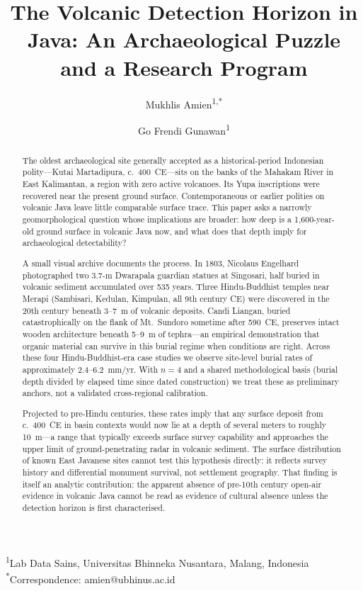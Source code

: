 \documentclass[12pt,a4paper]{article}
\begin{document}
\title{The Volcanic Detection Horizon in Java: An Archaeological Puzzle and a Research Program}

\author{Mukhlis Amien\textsuperscript{1,*} \and Go Frendi Gunawan\textsuperscript{1}}

\date{}

\maketitle

\noindent\textsuperscript{1}Lab Data Sains, Universitas Bhinneka Nusantara, Malang, Indonesia\\
\textsuperscript{*}Correspondence: amien@ubhinus.ac.id

\begin{abstract}
The oldest archaeological site generally accepted as a historical-period Indonesian polity---Kutai Martadipura, c.~400~CE---sits on the banks of the Mahakam River in East Kalimantan, a region with zero active volcanoes. Its Yupa inscriptions were recovered near the present ground surface. Contemporaneous or earlier polities on volcanic Java leave little comparable surface trace. This paper asks a narrowly geomorphological question whose implications are broader: how deep is a 1,600-year-old ground surface in volcanic Java now, and what does that depth imply for archaeological detectability?

A small visual archive documents the process. In 1803, Nicolaus Engelhard photographed two 3.7-m Dwarapala guardian statues at Singosari, half buried in volcanic sediment accumulated over 535 years. Three Hindu-Buddhist temples near Merapi (Sambisari, Kedulan, Kimpulan, all 9th century CE) were discovered in the 20th century beneath 3--7~m of volcanic deposits. Candi Liangan, buried catastrophically on the flank of Mt.\ Sundoro sometime after 590~CE, preserves intact wooden architecture beneath 5--9~m of tephra---an empirical demonstration that organic material can survive in this burial regime when conditions are right. Across these four Hindu-Buddhist-era case studies we observe site-level burial rates of approximately 2.4--6.2~mm/yr. With $n=4$ and a shared methodological basis (burial depth divided by elapsed time since dated construction) we treat these as preliminary anchors, not a validated cross-regional calibration.

Projected to pre-Hindu centuries, these rates imply that any surface deposit from c.~400~CE in basin contexts would now lie at a depth of several meters to roughly 10~m---a range that typically exceeds surface survey capability and approaches the upper limit of ground-penetrating radar in volcanic sediment. The surface distribution of known East Javanese sites cannot test this hypothesis directly: it reflects survey history and differential monument survival, not settlement geography. That finding is itself an analytic contribution: the apparent absence of pre-10th century open-air evidence in volcanic Java cannot be read as evidence of cultural absence unless the detection horizon is first characterised.


\end{abstract}
\end{document}
